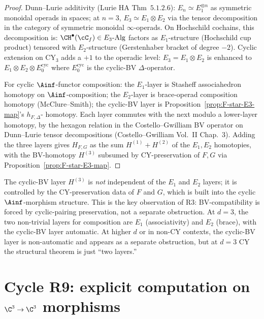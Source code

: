 \begin{proof}
Dunn--Lurie additivity (Lurie HA Thm~$5.1.2.6$): $E_n \simeq
E_1^{\otimes n}$ as symmetric monoidal operads in spaces; at $n = 3$,
$E_3 \simeq E_1 \otimes E_2$ via the tensor decomposition in the
category of symmetric monoidal $\infty$-operads.  On Hochschild
cochains, this decomposition is: $\CH^\bullet(\cC_f) \in E_3\text{-}
\mathrm{Alg}$ factors as $E_1$-structure (Hochschild cup product) tensored
with $E_2$-structure (Gerstenhaber bracket of degree $-2$).  Cyclic
extension on CY$_3$ adds a $+1$ to the operadic level: $E_3 = E_1
\otimes E_2$ is enhanced to $E_1 \otimes E_2 \otimes E_0^{\mathrm{cyc}}$
where $E_0^{\mathrm{cyc}}$ is the cyclic-BV $\Delta$-operator.

For cyclic $\Ainf$-functor composition: the $E_1$-layer is Stasheff
associahedron homotopy on $\Ainf$-composition; the $E_2$-layer is
brace-operad composition homotopy (McClure--Smith); the cyclic-BV
layer is Proposition~\ref{prop:F-star-E3-map}'s $h_{F, \Delta}$-
homotopy.  Each layer commutes with the next modulo a lower-layer
homotopy, by the hexagon relation in the Costello--Gwilliam BV
operator on Dunn--Lurie tensor decompositions (Costello--Gwilliam
Vol.~II Chap.~$3$).  Adding the three layers gives $H_{F,G}$ as the
sum $H^{(1)} + H^{(2)}$ of the $E_1, E_2$ homotopies, with the
BV-homotopy $H^{(3)}$ subsumed by CY-preservation of $F, G$ via
Proposition~\ref{prop:F-star-E3-map}.
\end{proof}

\begin{remark}
\label{rem:two-layers-not-three}
The cyclic-BV layer $H^{(3)}$ is \emph{not} independent of the $E_1$
and $E_2$ layers; it is controlled by the CY-preservation data of $F$
and $G$, which is built into the cyclic $\Ainf$-morphism structure.
This is the key observation of R3: BV-compatibility is forced by
cyclic-pairing preservation, not a separate obstruction.  At $d = 3$,
the two non-trivial layers for composition are $E_1$ (associativity)
and $E_2$ (brace), with the cyclic-BV layer automatic.  At higher $d$
or in non-CY contexts, the cyclic-BV layer is non-automatic and
appears as a separate obstruction, but at $d = 3$ CY the structural
theorem is just ``two layers.''
\end{remark}

\section*{Cycle R9: explicit computation on $\C^3 \to \C^3$ morphisms}

